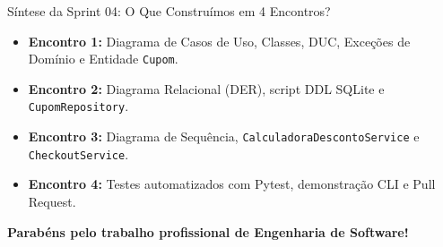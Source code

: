 \documentclass[10pt]{beamer}
\begin{document}
\begin{frame}{Síntese da Sprint 04: O Que Construímos em 4 Encontros?}
    \begin{itemize}
        \item \textbf{Encontro 1:} Diagrama de Casos de Uso, Classes, DUC, Exceções de Domínio e Entidade \texttt{Cupom}.
        \item \textbf{Encontro 2:} Diagrama Relacional (DER), script DDL SQLite e \texttt{CupomRepository}.
        \item \textbf{Encontro 3:} Diagrama de Sequência, \texttt{CalculadoraDescontoService} e \texttt{CheckoutService}.
        \item \textbf{Encontro 4:} Testes automatizados com Pytest, demonstração CLI e Pull Request.
    \end{itemize}
    \vspace{0.4cm}
    \centering
    \textbf{Parabéns pelo trabalho profissional de Engenharia de Software!}
\end{frame}
\end{document}
